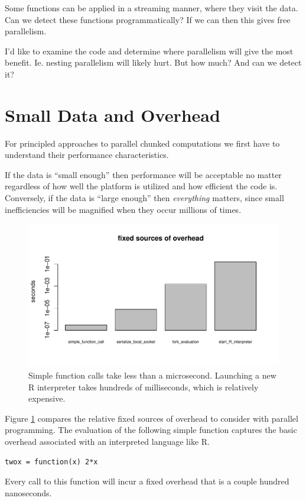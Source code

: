 \documentclass[12pt]{article}
\begin{document}
Some functions can be applied in a streaming manner, where they visit the
data. Can we detect these functions programmatically? If we can then this
gives free parallelism.

I'd like to examine the code and determine where parallelism will give the
most benefit. Ie. nesting parallelism will likely hurt. But how much? And
can we detect it?

\section{Small Data and Overhead}

For principled approaches to parallel chunked computations we
first have to understand their performance characteristics.

If the data is ``small enough'' then performance will be acceptable no
matter regardless of how well the platform is utilized and how efficient
the code is. Conversely, if the data is ``large enough'' then
\emph{everything} matters, since small inefficiencies will be magnified
when they occur millions of times.

\begin{figure}
\centering
\includegraphics[width=.8\linewidth]{compute_times/overhead}
\caption{Simple function calls take less than a microsecond. Launching a
    new R interpreter takes hundreds of milliseconds, which is relatively expensive.}
\label{fig:overhead}
\end{figure}

Figure \ref{fig:overhead} compares the relative fixed sources of overhead to
consider with parallel programming. The evaluation of the following simple
function captures the basic overhead associated with an interpreted
language like R.
\begin{verbatim}
twox = function(x) 2*x
\end{verbatim}
Every call to this function will incur a fixed overhead that is a couple
hundred nanoseconds. 
\end{document}
